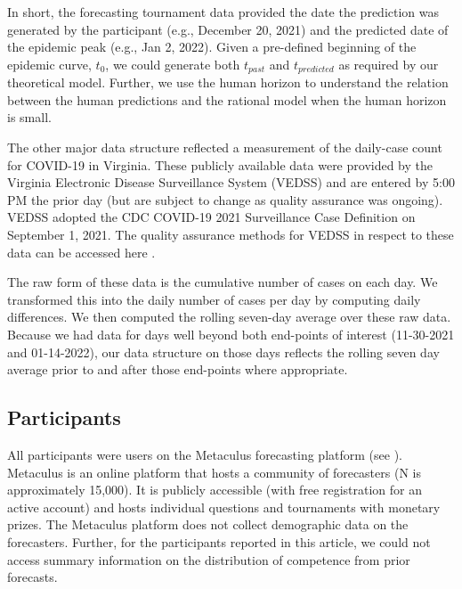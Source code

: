 In short, the forecasting tournament data provided the date the prediction was generated by the participant (e.g., December 20, 2021) and the predicted date of the epidemic peak (e.g., Jan 2, 2022). Given a pre-defined beginning of the epidemic curve, $t_0$, we could generate both $t_{past}$ and $t_{predicted}$ as required by our theoretical model.  Further, we use the human horizon to understand the relation between the human predictions and the rational model when the human horizon is small.

The other major data structure reflected a measurement of the daily-case count for COVID-19 in Virginia.  These publicly available data were provided by the Virginia Electronic Disease Surveillance System (VEDSS) \citep{VDHOnline} and are entered by 5:00 PM the prior day (but are subject to change as quality assurance was ongoing).  VEDSS adopted the CDC COVID-19 2021 Surveillance Case Definition \citep{CDCguide} on September 1, 2021.  The quality assurance methods for VEDSS in respect to these data can be accessed here \citep{VDHquality}.

The raw form of these data is the cumulative number of cases on each day.  We transformed this into the daily number of cases per day by computing daily differences.  We then computed the rolling seven-day average over these raw data.  Because we had data for days well beyond both end-points of interest (11-30-2021 and 01-14-2022), our data structure on those days reflects the rolling seven day average prior to and after those end-points where appropriate.

\subsection{Participants}\label{participants}
All participants were users on the Metaculus forecasting platform (see \citep{metaculus}).  Metaculus is an online platform that hosts a community of forecasters (N is approximately 15,000). It is publicly accessible (with free registration for an active account) and hosts individual questions and tournaments with monetary prizes.  The Metaculus platform does not collect demographic data on the forecasters.  Further, for the participants reported in this article, we could not access summary information on the distribution of competence from prior forecasts. 

